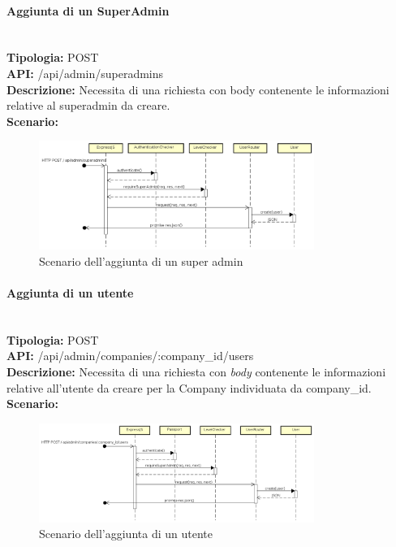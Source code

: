\newpage
\paragraph{Aggiunta di un SuperAdmin}\mbox{}\\
\textbf{Tipologia:} POST \\
\textbf{API:} /api/admin/superadmins \\
\textbf{Descrizione:} Necessita di una richiesta con body contenente le informazioni relative al superadmin da creare. \\
\textbf{Scenario:} 
\begin{figure}[H]
\centering
\includegraphics[width=0.8\textwidth]{res/sections/backend/sequence/(POST)superadmin.png}
\caption{Scenario dell'aggiunta di un super admin}
\end{figure}

\newpage
\paragraph{Aggiunta di un utente}\mbox{}\\
\textbf{Tipologia:} POST \\
\textbf{API:} /api/admin/companies/:company\_id/users \\
\textbf{Descrizione:} Necessita di una richiesta con \textit{body} contenente le informazioni relative all'utente da creare per la Company individuata da company\_id. \\
\textbf{Scenario:} 
\begin{figure}[H]
\centering
\includegraphics[width=0.8\textwidth]{res/sections/backend/sequence/(POST)userSA.png}
\caption{Scenario dell'aggiunta di un utente}
\end{figure}
